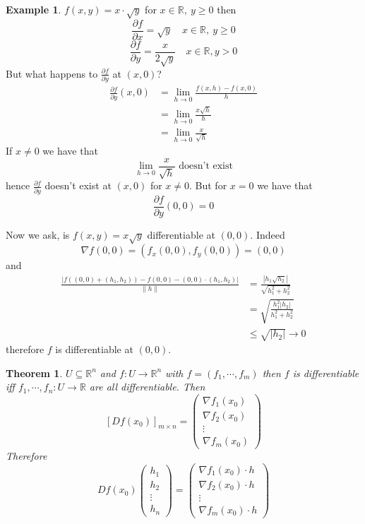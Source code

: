 \documentclass[11pt,a4paper]{article}
\theoremstyle{definition}
\newtheorem{example}[definition]{Example}
\theoremstyle{plain}
\newtheorem{theorem}[definition]{Theorem}
\theoremstyle{remark}
\newcommand{\R}{\mathbb{R}}
\newcommand{\norm}[1]{\lVert #1 \rVert}
\begin{document}
\begin{example}
    $f(x,y) = x \cdot \sqrt{y}$ for $x \in \R, \ y \ge 0$ then 
    $$\frac{\partial f}{\partial x} = \sqrt{y}\quad x \in \R, \ y \ge 0$$
    $$\frac{\partial f}{\partial y} = \frac{x}{2\sqrt{y}} \quad x \in \R, y > 0$$
    But what happens to $\frac{\partial f}{\partial y}$ at $(x,0)$? 
    \begin{align*}
        \frac{\partial f}{\partial y} (x,0) &= \lim_{h \to 0} \frac{f(x, h) - f(x,0)}{h} \\
        &= \lim_{h \to 0} \frac{x \sqrt h}{h} \\
        &= \lim_{h \to 0} \frac{x}{\sqrt h}
    \end{align*} 
    If $x \ne 0$ we have that 
    $$\lim_{h \to 0} \frac{x}{\sqrt{h}} \text{ doesn't exist}$$
    hence $\frac{\partial f}{\partial y}$ doesn't exist at $(x,0)$ for $x \ne 0$. But for $x = 0$ we have that 
    $$\frac{\partial f}{\partial y} (0,0) = 0$$ 

    Now we ask, is $f(x,y) = x \sqrt{y}$ differentiable at $(0,0)$. Indeed 
    $$\nabla f (0,0) = (f_x(0,0), f_y(0,0)) = (0,0)$$
    and 
    \begin{align*}
        \frac{|f\left((0,0 )+ (h_1, h_2)\right)- f(0,0) - (0,0) \cdot (h_1,h_2)|}{\norm{h}} &= \frac{|h_1 \sqrt{h_2}|}{\sqrt{h_1^2 + h_2^2}} \\
        &= \sqrt{\frac{h_1^2 |h_2|}{h_1^2 + h_2^2}} \\
        &\le \sqrt{|h_2|} \to 0
    \end{align*}
    therefore $f$ is differentiable at $(0,0)$.
\end{example}

\begin{theorem}
    $U \subseteq \R^n$ and $f \colon U \to \R^n$ with $f= (f_1, \cdots, f_m)$ then 
    $f$ is differentiable iff $f_1, \cdots, f_n \colon U \to \R$ are all differentiable. Then 
    $$[Df(x_0)]_{m \times n} = \begin{pmatrix}
        \nabla f_1 (x_0) \\
        \nabla f_2 (x_0)\\
        \vdots \\
        \nabla f_m(x_0)
    \end{pmatrix} $$
    Therefore 
    $$Df(x_0) \begin{pmatrix}
        h_1 \\ h_2 \\ \vdots \\ h_n
    \end{pmatrix} = \begin{pmatrix}
        \nabla f_1 (x_0) \cdot h \\
        \nabla f_2 (x_0) \cdot h \\
        \vdots \\ 
        \nabla f_m (x_0) \cdot h
    \end{pmatrix}$$
\end{theorem}
\end{document}
